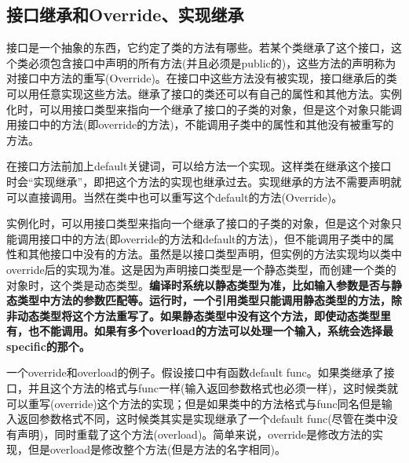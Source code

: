 \documentclass{article}
\begin{document}
	\subsection{接口继承和Override、实现继承}
	接口是一个抽象的东西，它约定了类的方法有哪些。若某个类继承了这个接口，这个类必须包含接口中声明的所有方法(并且必须是public的)，这些方法的声明称为对接口中方法的重写(Override)。在接口中这些方法没有被实现，接口继承后的类可以用任意实现这些方法。继承了接口的类还可以有自己的属性和其他方法。实例化时，可以用接口类型来指向一个继承了接口的子类的对象，但是这个对象只能调用接口中的方法(即override的方法)，不能调用子类中的属性和其他没有被重写的方法。
	
	在接口方法前加上default关键词，可以给方法一个实现。这样类在继承这个接口时会“实现继承”，即把这个方法的实现也继承过去。实现继承的方法不需要声明就可以直接调用。当然在类中也可以重写这个default的方法(Override)。
	
	实例化时，可以用接口类型来指向一个继承了接口的子类的对象，但是这个对象只能调用接口中的方法(即override的方法和default的方法)，但不能调用子类中的属性和其他接口中没有的方法。虽然是以接口类型声明，但实例的方法实现均以类中override后的实现为准。这是因为声明接口类型是一个静态类型，而创建一个类的对象时，这个类是动态类型。{\bfseries 编译时系统以静态类型为准，比如输入参数是否与静态类型中方法的参数匹配等。运行时，一个引用类型只能调用静态类型的方法，除非动态类型将这个方法重写了。如果静态类型中没有这个方法，即使动态类型里有，也不能调用。如果有多个overload的方法可以处理一个输入，系统会选择最specific的那个。}
	
	一个override和overload的例子。假设接口中有函数default func。如果类继承了接口，并且这个方法的格式与func一样(输入返回参数格式也必须一样)，这时候类就可以重写(override)这个方法的实现；但是如果类中的方法格式与func同名但是输入返回参数格式不同，这时候类其实是实现继承了一个default func(尽管在类中没有声明)，同时重载了这个方法(overload)。简单来说，override是修改方法的实现，但是overload是修改整个方法(但是方法的名字相同)。
\end{document}
